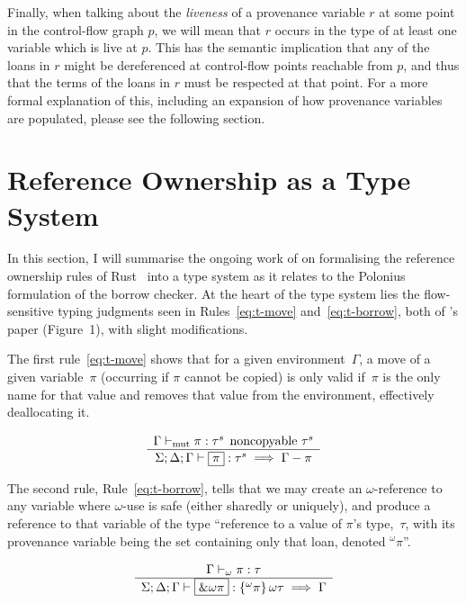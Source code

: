 \documentclass[11pt,a4paper,twoside,openany]{report}
\newcommand{\expression}[1]{\boxed{#1}}
\newcommand{\ntyperule}[2]{\begin{array}{c}#1\\\hline\raisebox{1pt}{\strut}#2\end{array}}
\begin{document}
Finally, when talking about the \emph{liveness} of a provenance variable $r$ at
some point in the control-flow graph $p$, we will mean that $r$ occurs in the
type of at least one variable which is live at $p$. This has the semantic
implication that any of the loans in $r$ might be dereferenced at control-flow
points reachable from $p$, and thus that the terms of the loans in $r$ must be
respected at that point. For a more formal explanation of this, including an
expansion of how provenance variables are populated, please see the following
section.

\section{Reference Ownership as a Type System}\label{sec:type-system}

In this section, I will summarise the ongoing work of
\citeauthor{weiss_oxide:_2019} on formalising the reference ownership rules of
Rust~\cite{weiss_oxide:_2019} into a type system as it relates to the Polonius
formulation of the borrow checker. At the heart of the type system lies the
flow-sensitive typing judgments seen in Rules~\ref{eq:t-move}
and~\ref{eq:t-borrow}, both of \citeauthor{weiss_oxide:_2019}'s paper
(Figure~1), with slight modifications.

The first rule~\eqref{eq:t-move} shows that for a given environment~$\Gamma$, a
move of a given variable~$\pi$ (occurring if $\pi$ cannot be copied) is only
valid if~$\pi$ is the only name for that value and removes that value from the
environment, effectively deallocating it.

\begin{equation}\label{eq:t-move}
  \ntyperule{\Gamma \vdash_{\text{mut}} \pi : \tau^s \:\: \text{noncopyable } \tau^s}
  {\Sigma ; \Delta ; \Gamma \vdash \expression{\pi} : \tau^s \implies \Gamma - \pi}
  \end{equation}

  The second rule, Rule~\eqref{eq:t-borrow}, tells that we may create an
  $\omega$-reference to any variable where $\omega$-use is safe (either sharedly
  or uniquely), and produce a reference to that variable of the type ``reference
  to a value of $\pi$'s type,~$\tau$, with its provenance variable being the set
  containing only that loan, denoted $^{\omega}\pi$''.

\begin{equation}\label{eq:t-borrow}
  \ntyperule{\Gamma \vdash_{\omega} \pi : \tau}
  {\Sigma ; \Delta ; \Gamma \vdash \expression{\&\omega \pi} : \left \{ ^{\omega}\pi\right \} \omega \tau \implies \Gamma}
\end{equation}
\end{document}
